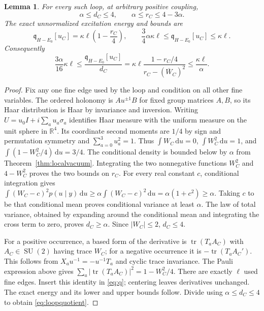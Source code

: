 \documentclass[11pt]{article}
\newtheorem{lemma}[theorem]{Lemma}
\newcommand{\SU}{\operatorname{SU}}
\newcommand{\tr}{\operatorname{tr}}
\newcommand{\dd}{\,\mathrm d}
\begin{document}
\begin{lemma}\label{lem:loopmoments}
For every such loop, at arbitrary positive coupling,
\begin{equation}\label{eq:loopnorm}
 \alpha\leq d_C\leq4,\qquad
 \alpha\leq r_C\leq4-3\alpha.
\end{equation}
The exact unnormalized excitation energy and bounds are
\begin{equation}\label{eq:loopenergy}
 \mathfrak q_{H-E_0}[u_C]
   =\kappa\ell\left(1-\frac{r_C}{4}\right),\qquad
 \frac34\alpha\kappa\ell\leq\mathfrak q_{H-E_0}[u_C]\leq\kappa\ell.
\end{equation}
Consequently
\begin{equation}\label{eq:loopquotient}
 \frac{3\alpha}{16}\kappa\ell\leq
 \frac{\mathfrak q_{H-E_0}[u_C]}{d_C}
 =\kappa\ell\frac{1-r_C/4}{r_C-(\overline W_C)^2}
 \leq\frac{\kappa\ell}{\alpha}.
\end{equation}
\end{lemma}
\begin{proof}
Fix any one fine edge used by the loop and condition on all other fine
variables. The ordered holonomy is $A u^{\pm1}B$ for fixed group matrices
$A,B$, so its Haar distribution is Haar by invariance and inversion.
Writing $U=u_0I+i\sum_a u_a\sigma_a$ identifies Haar measure with the
uniform measure on the unit sphere in $\mathbb R^4$. Its coordinate
second moments are $1/4$ by sign and permutation symmetry and
$\sum_{a=0}^3u_a^2=1$. Thus
$\int W_C\dd u=0$, $\int W_C^2\dd u=1$, and
$\int(1-W_C^2/4)\dd u=3/4$.
The conditional density is bounded below by $\alpha$ from
Theorem~\ref{thm:localvacuum}. Integrating the two nonnegative functions
$W_C^2$ and $4-W_C^2$ proves the two bounds on $r_C$.
For every real constant $c$, conditional integration gives
$\int(W_C-c)^2p(u\mid y)\dd u\geq\alpha\int(W_C-c)^2\dd u
=\alpha(1+c^2)\geq\alpha$.
Taking $c$ to be that conditional mean proves conditional variance
at least $\alpha$. The law of total variance, obtained by expanding
around the conditional mean and integrating the cross term to zero,
proves $d_C\geq\alpha$. Since $|W_C|\leq2$, $d_C\leq4$.

For a positive occurrence, a based form of the derivative is
$\tr(T_aA_C)$ with $A_C\in\SU(2)$ having trace $W_C$; for a negative
occurrence it is $-\tr(T_aA_C')$. This follows from
$X_a u^{-1}=-u^{-1}T_a$ and cyclic trace invariance. The Pauli expression
above gives $\sum_a|\tr(T_aA_C)|^2=1-W_C^2/4$.
There are exactly $\ell$ used fine edges. Insert this identity in
\eqref{eq:q}; centering leaves derivatives unchanged. The exact energy
and its lower and upper bounds follow. Divide using
$\alpha\leq d_C\leq4$ to obtain \eqref{eq:loopquotient}.
\end{proof}
\end{document}
